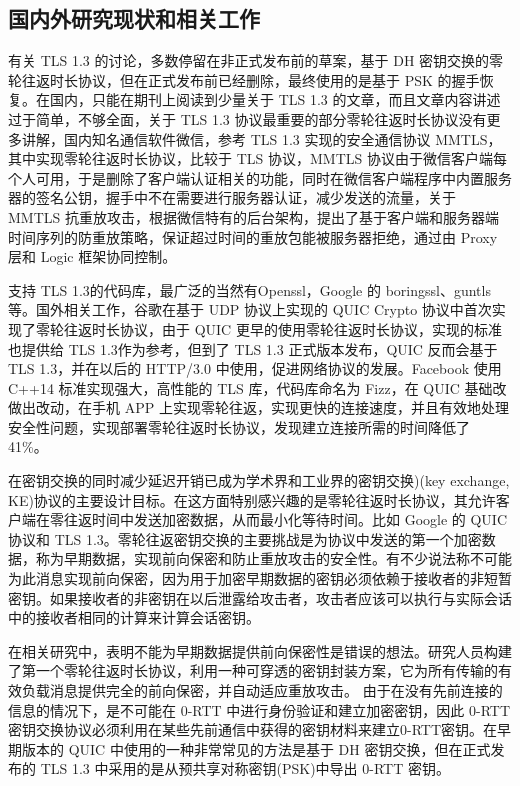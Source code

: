 \subsection{国内外研究现状和相关工作}
\label{sec:related_work}
  有关 TLS 1.3 的讨论，多数停留在非正式发布前\cite{7883842}\cite{ARTICLE_typical1}\cite{ARTICLE_typical}的草案，基于 DH 密钥交换的零轮往返时长协议，但在正式发布前已经删除，最终使用的是基于 PSK 的握手恢复。在国内，只能在期刊上阅读到少量关于 TLS 1.3 的文章，而且文章内容讲述过于简单，不够全面，关于 TLS 1.3 协议最重要的部分零轮往返时长协议没有更多讲解，国内知名通信软件微信，参考 TLS 1.3 实现的安全通信协议 MMTLS\cite{MMTLS}，其中实现零轮往返时长协议，比较于 TLS 协议，MMTLS 协议由于微信客户端每个人可用，于是删除了客户端认证相关的功能，同时在微信客户端程序中内置服务器的签名公钥，握手中不在需要进行服务器认证，减少发送的流量，关于 MMTLS 抗重放攻击，根据微信特有的后台架构，提出了基于客户端和服务器端时间序列的防重放策略，保证超过时间的重放包能被服务器拒绝，通过由 Proxy 层和 Logic 框架协同控制。
  
  支持 TLS 1.3的代码库，最广泛的当然有Openssl，Google 的 boringssl、guntls 等。国外相关工作，谷歌在基于 UDP 协议上实现的 QUIC Crypto 协议\cite{8280429}中首次实现了零轮往返时长协议，由于 QUIC 更早的使用零轮往返时长协议，实现的标准也提供给 TLS 1.3作为参考，但到了 TLS 1.3 正式版本发布，QUIC 反而会基于 TLS 1.3，并在以后的 HTTP/3.0 中使用，促进网络协议的发展。Facebook 使用 C++14 标准实现强大，高性能的 TLS 库，代码库命名为 Fizz，在 QUIC 基础改做出改动，在手机 APP 上实现零轮往返，实现更快的连接速度，并且有效地处理安全性问题，实现部署零轮往返时长协议，发现建立连接所需的时间降低了 41\%。
  
  在密钥交换的同时减少延迟开销已成为学术界和工业界的密钥交换)(key exchange, KE)协议的主要设计目标。在这方面特别感兴趣的是零轮往返时长协议，其允许客户端在零往返时间中发送加密数据，从而最小化等待时间。比如 Google 的 QUIC 协议和 TLS 1.3。零轮往返密钥交换的主要挑战是为协议中发送的第一个加密数据，称为早期数据，实现前向保密和防止重放攻击的安全性。有不少说法称不可能为此消息实现前向保密，因为用于加密早期数据的密钥必须依赖于接收者的非短暂密钥。如果接收者的非密钥在以后泄露给攻击者，攻击者应该可以执行与实际会话中的接收者相同的计算来计算会话密钥。
  
  在相关研究中，表明不能为早期数据提供前向保密性是错误的想法。研究人员构建了第一个零轮往返时长协议，利用一种可穿透的密钥封装方案，它为所有传输的有效负载消息提供完全的前向保密，并自动适应重放攻击。
  由于在没有先前连接的信息的情况下，是不可能在 0-RTT 中进行身份验证和建立加密密钥，因此 0-RTT 密钥交换协议必须利用在某些先前通信中获得的密钥材料来建立0-RTT密钥。在早期版本的 QUIC 中使用的一种非常常见的方法是基于 DH 密钥交换，但在正式发布的 TLS 1.3 中采用的是从预共享对称密钥(PSK)中导出 0-RTT 密钥。

